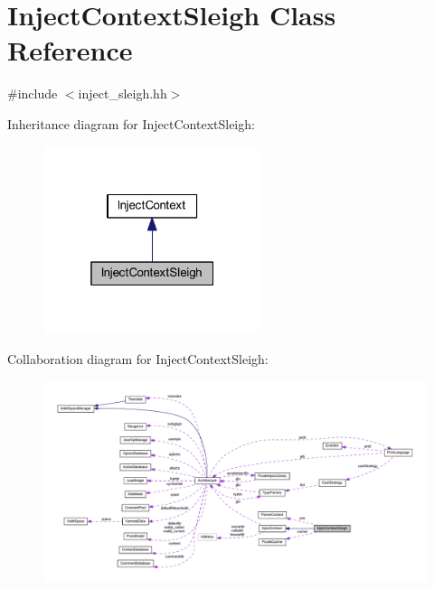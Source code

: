 \hypertarget{class_inject_context_sleigh}{}\section{Inject\+Context\+Sleigh Class Reference}
\label{class_inject_context_sleigh}


{\ttfamily \#include $<$inject\+\_\+sleigh.\+hh$>$}



Inheritance diagram for Inject\+Context\+Sleigh\+:
\nopagebreak
\begin{figure}[H]
\begin{center}
\leavevmode
\includegraphics[width=181pt]{class_inject_context_sleigh__inherit__graph}
\end{center}
\end{figure}


Collaboration diagram for Inject\+Context\+Sleigh\+:
\nopagebreak
\begin{figure}[H]
\begin{center}
\leavevmode
\includegraphics[width=350pt]{class_inject_context_sleigh__coll__graph}
\end{center}
\end{figure}
